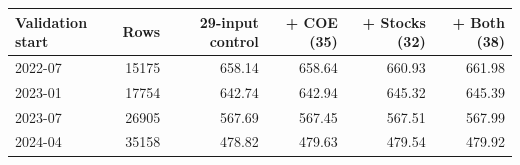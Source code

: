 \begin{tabular}{lrrrrr}
\toprule
Validation start & Rows & 29-input control & + COE (35) & + Stocks (32) & + Both (38) \\
\midrule
2022-07 & 15175 & 658.14 & 658.64 & 660.93 & 661.98 \\
2023-01 & 17754 & 642.74 & 642.94 & 645.32 & 645.39 \\
2023-07 & 26905 & 567.69 & 567.45 & 567.51 & 567.99 \\
2024-04 & 35158 & 478.82 & 479.63 & 479.54 & 479.92 \\
\bottomrule
\end{tabular}

